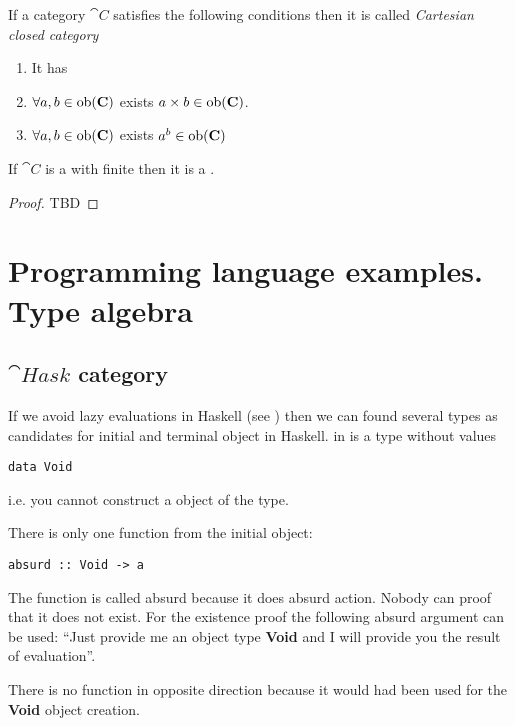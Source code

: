 \begin{definition}
\label{def:cartesian_closed_category}
If a category $\cat{C}$ satisfies the following conditions then it is
called \textit{Cartesian closed category}
\begin{enumerate}
\item It has 
\item $\forall a,b \in \mathrm{ob}(\mathbf{C})$ exists  $a
  \times b \in \mathrm{ob}(\mathbf{C})$.
\item $\forall a,b \in \mathrm{ob}(\mathbf{C})$ exists 
  $a^b \in \mathrm{ob}(\mathbf{C})$
\end{enumerate}
\end{definition}

\begin{theorem}
\label{thm:ccc}
If $\cat{C}$ is a  with
finite  then it is a
.
\begin{proof}
TBD
\end{proof}
\end{theorem}

\section{Programming language examples. Type algebra}

\subsection{$\cat{Hask}$ category}
\begin{example}
If we avoid lazy evaluations in Haskell (see
) then we can found several types
as candidates for initial and terminal object in Haskell. 
\label{ex:hask_initial_object}
 in  is a
type without values 
\begin{verbatim}
data Void
\end{verbatim}
i.e. you cannot construct a object of the type.

There is only one function from the initial object:
\begin{verbatim}
absurd :: Void -> a
\end{verbatim}
The function is called absurd because it does absurd action. Nobody
can proof that it does not exist. For the existence proof the
following absurd argument can be used: ``Just provide me an object type
\textbf{Void} and I will provide you the result of
evaluation''.  

There is no function in opposite direction because it would had been
used for the \textbf{Void} object creation. 
\end{example}

